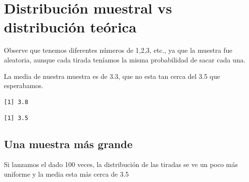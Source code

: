 \documentclass[
  letterpaper,
  DIV=11,
  numbers=noendperiod]{scrreprt}
\newenvironment{Shaded}{\begin{snugshade}}{\end{snugshade}}
\newcommand{\AttributeTok}[1]{\textcolor[rgb]{0.40,0.45,0.13}{#1}}
\newcommand{\ConstantTok}[1]{\textcolor[rgb]{0.56,0.35,0.01}{#1}}
\newcommand{\DecValTok}[1]{\textcolor[rgb]{0.68,0.00,0.00}{#1}}
\newcommand{\FunctionTok}[1]{\textcolor[rgb]{0.28,0.35,0.67}{#1}}
\newcommand{\NormalTok}[1]{\textcolor[rgb]{0.00,0.23,0.31}{#1}}
\newcommand{\OtherTok}[1]{\textcolor[rgb]{0.00,0.23,0.31}{#1}}
\newcommand{\SpecialCharTok}[1]{\textcolor[rgb]{0.37,0.37,0.37}{#1}}
\begin{document}
\hypertarget{distribuciuxf3n-muestral-vs-distribuciuxf3n-teuxf3rica}{%
\section{Distribución muestral vs distribución
teórica}\label{distribuciuxf3n-muestral-vs-distribuciuxf3n-teuxf3rica}}

Observe que tenemos diferentes números de 1,2,3, etc., ya que la muestra
fue aleatoria, aunque cada tirada teníamos la misma probabilidad de
sacar cada una.

La media de nuestra muestra es de 3.3, que no esta tan cerca del 3.5 que
esperabamos.

\begin{Shaded}
\end{Shaded}

\begin{verbatim}
[1] 3.8
\end{verbatim}

\begin{Shaded}
\end{Shaded}

\begin{verbatim}
[1] 3.5
\end{verbatim}

\hypertarget{una-muestra-muxe1s-grande}{%
\subsection{Una muestra más grande}\label{una-muestra-muxe1s-grande}}

Si lanzamos el dado 100 veces, la distribución de las tiradas se ve un
poco más uniforme y la media esta más cerca de 3.5

\begin{Shaded}
\end{Shaded}
\end{document}
